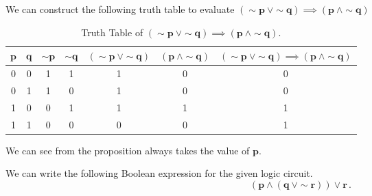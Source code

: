 %
%

\begin{subquestions}


\subquestion

We can construct the following truth table to evaluate $\boldsymbol{(\sim p ~\lor \sim q) \implies (p ~\land \sim q)}$
\begin{table}[ht]
	\centering
	\begin{tabular}{|c|c|c|c|c|c|c|}
		\hline
			$\boldsymbol{p}$ & $\boldsymbol{q}$ & $\boldsymbol{\sim p}$ & $\boldsymbol{\sim q}$ & $\boldsymbol{(\sim p \ \lor \sim q)}$ & $\boldsymbol{(p \ \land \sim q)}$ & $\boldsymbol{(\sim p \ \lor \sim  q) \implies (p \ \land \sim q)}$ \\
		\hline
		0 & 0 & 1 & 1 & 1 & 0 & 0 \\
		0 & 1 & 1 & 0 & 1 & 0 & 0 \\
		1 & 0 & 0 & 1 & 1 & 1 & 1 \\
		1 & 1 & 0 & 0 & 0 & 0 & 1 \\
		\hline
	\end{tabular}
	\caption{\label{2011:q1:tab:TruthTab1} Truth Table of $\boldsymbol{(\sim p ~\lor \sim q) \implies (p ~\land \sim q)}$.}
\end{table}

We can see from  the proposition always takes the value of $\boldsymbol{p}$.

\subquestion

We can write the following Boolean expression for the given logic circuit.
\begin{equation}
	\boldsymbol{(p \land (q ~\lor \sim r)) \lor r}\,.
\end{equation}


\end{subquestions}

